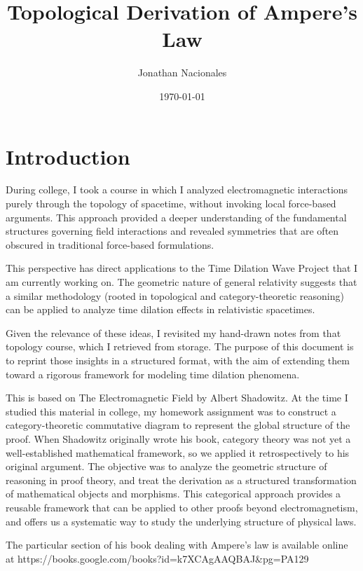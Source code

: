 \documentclass{article}
\begin{document}
\title{Topological Derivation of Ampere's Law}
\author{Jonathan Nacionales}
\date{\today}
\maketitle

\onehalfspacing
\setlength{\parindent}{0pt}
\setlength{\parskip}{\baselineskip}

\section{Introduction}

During college, I took a course in which I analyzed electromagnetic interactions purely through the topology of spacetime, without invoking local force-based arguments. This approach provided a deeper understanding of the fundamental structures governing field interactions and revealed symmetries that are often obscured in traditional force-based formulations.

This perspective has direct applications to the Time Dilation Wave Project that I am currently working on. The geometric nature of general relativity suggests that a similar methodology (rooted in topological and category-theoretic reasoning) can be applied to analyze time dilation effects in relativistic spacetimes.

Given the relevance of these ideas, I revisited my hand-drawn notes from that topology course, which I retrieved from storage. The purpose of this document is to reprint those insights in a structured format, with the aim of extending them toward a rigorous framework for modeling time dilation phenomena.

This is based on The Electromagnetic Field by Albert Shadowitz. At the time I studied this material in college, my homework assignment was to construct a category-theoretic commutative diagram to represent the global structure of the proof. When Shadowitz originally wrote his book, category theory was not yet a well-established mathematical framework, so we applied it retrospectively to his original argument. The objective was to analyze the geometric structure of reasoning in proof theory, and treat the derivation as a structured transformation of mathematical objects and morphisms. This categorical approach provides a reusable framework that can be applied to other proofs beyond electromagnetism, and offers us a systematic way to study the underlying structure of physical laws.

The particular section of his book dealing with Ampere's law is available online at https://books.google.com/books?id=k7XCAgAAQBAJ\&pg=PA129
\end{document}
